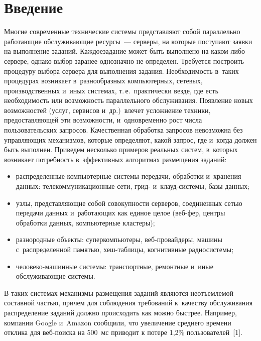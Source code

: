 \thispagestyle{headings}

\begin{multicols}{2}

\label{st\stat}

\section{Введение}

    Многие современные технические системы представляют собой параллельно 
работающие обслуживающие ресурсы~--- серверы, на которые поступают заявки на 
выполнение заданий. Каж\-дое\linebreak зада\-ние может быть выполнено на ка\-ком-ли\-бо сервере, 
однако выбор заранее однозначно не определен. Требуется построить процедуру выбора 
сервера для выполнения задания. Необходимость в~таких процедурах возникает 
в~разнообразных компьютерных, сетевых, производственных и~иных сис\-те\-мах, т.\,е.\ 
практически везде, где есть необходимость или возможность параллельного 
обслуживания. Появление новых возможностей (услуг, сервисов и~др.)\ влечет 
усложнение техники, пред\-остав\-ля\-ющей эти возможности, и~одновременно рост числа 
пользовательских запросов. Качественная обработка запросов невозможна без 
управляющих механизмов, которые определяют, какой запрос, где и~когда должен быть 
выполнен. Приведем несколько примеров реальных систем, в~которых возникает 
потребность в~эффективных алгоритмах размещения заданий:
    \begin{itemize}
\item распределенные компьютерные системы передачи, обработки и~хранения данных: 
телекоммуникационные сети, грид- и~клауд-сис\-те\-мы, базы данных;
\item узлы, представляющие собой совокупности серверов, соединенных сетью передачи 
данных и~работающих как единое целое (веб-фер\-, цент\-ры обработки данных, 
компьютерные кластеры);
\item разнородные объекты: суперкомпьютеры, веб-про\-вай\-де\-ры, машины 
с~распределенной па\-мятью, хеш-таб\-ли\-цы, когнитивные ра\-дио\-сис\-темы;
\item человеко-машинные системы: транспортные, ремонтные и~иные обслуживающие 
системы.
\end{itemize}

    В таких системах механизмы размещения заданий являются неотъемлемой составной 
частью, причем для соблюдения требований к~качеству обслуживания распределение 
заданий должно происходить как можно быстрее. Например, компании Google и~Amazon 
сообщили, что увеличение среднего времени отклика для веб-поиска на 500~мс приводит 
к потере 1,2\% пользователей~[1].
     

\end{multicols}
